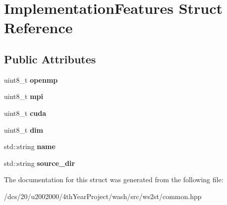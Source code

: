 \hypertarget{structImplementationFeatures}{}\section{Implementation\+Features Struct Reference}
\label{structImplementationFeatures}
\subsection*{Public Attributes}
\begin{DoxyCompactItemize}
\item 
\mbox{\label{structImplementationFeatures_a38b97cc0b2f3ea9db019845264fc060b}} 
uint8\+\_\+t {\bfseries openmp}
\item 
\mbox{\label{structImplementationFeatures_a87a6ded1fc05396de42c11b17d41beca}} 
uint8\+\_\+t {\bfseries mpi}
\item 
\mbox{\label{structImplementationFeatures_ac8156c774edb85175df22ff7f31dda44}} 
uint8\+\_\+t {\bfseries cuda}
\item 
\mbox{\label{structImplementationFeatures_aaeaaaf6e801ac06863ba363591e938d7}} 
uint8\+\_\+t {\bfseries dim}
\item 
\mbox{\label{structImplementationFeatures_a7b7fb4c4e8fbf262d6697b8c25a17b5f}} 
std\+::string {\bfseries name}
\item 
\mbox{\label{structImplementationFeatures_afe154ad26b28217f95c4cc74d7112049}} 
std\+::string {\bfseries source\+\_\+dir}
\end{DoxyCompactItemize}


The documentation for this struct was generated from the following file\+:\begin{DoxyCompactItemize}
\item 
/dcs/20/u2002000/4th\+Year\+Project/wash/src/ws2st/common.\+hpp\end{DoxyCompactItemize}
